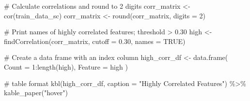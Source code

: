 \documentclass[
  letterpaper,
  DIV=11,
  numbers=noendperiod]{scrreprt}
\newenvironment{Shaded}{\begin{snugshade}}{\end{snugshade}}
\newcommand{\AttributeTok}[1]{\textcolor[rgb]{0.40,0.45,0.13}{#1}}
\newcommand{\CommentTok}[1]{\textcolor[rgb]{0.37,0.37,0.37}{#1}}
\newcommand{\ConstantTok}[1]{\textcolor[rgb]{0.56,0.35,0.01}{#1}}
\newcommand{\DecValTok}[1]{\textcolor[rgb]{0.68,0.00,0.00}{#1}}
\newcommand{\FloatTok}[1]{\textcolor[rgb]{0.68,0.00,0.00}{#1}}
\newcommand{\FunctionTok}[1]{\textcolor[rgb]{0.28,0.35,0.67}{#1}}
\newcommand{\NormalTok}[1]{\textcolor[rgb]{0.00,0.23,0.31}{#1}}
\newcommand{\OtherTok}[1]{\textcolor[rgb]{0.00,0.23,0.31}{#1}}
\newcommand{\SpecialCharTok}[1]{\textcolor[rgb]{0.37,0.37,0.37}{#1}}
\newcommand{\StringTok}[1]{\textcolor[rgb]{0.13,0.47,0.30}{#1}}
\begin{document}
\begin{Shaded}
\begin{Highlighting}[]
\CommentTok{\# Calculate correlations and round to 2 digits}
\NormalTok{corr\_matrix }\OtherTok{\textless{}{-}} \FunctionTok{cor}\NormalTok{(train\_data\_sc)}
\NormalTok{corr\_matrix }\OtherTok{\textless{}{-}} \FunctionTok{round}\NormalTok{(corr\_matrix, }\AttributeTok{digits =} \DecValTok{2}\NormalTok{)}

\CommentTok{\# Print names of highly correlated features; threshold \textgreater{} 0.30}
\NormalTok{high }\OtherTok{\textless{}{-}} \FunctionTok{findCorrelation}\NormalTok{(corr\_matrix, }\AttributeTok{cutoff =} \FloatTok{0.30}\NormalTok{, }\AttributeTok{names =} \ConstantTok{TRUE}\NormalTok{)}

\CommentTok{\# Create a data frame with an index column}
\NormalTok{high\_corr\_df }\OtherTok{\textless{}{-}} \FunctionTok{data.frame}\NormalTok{(}
  \AttributeTok{Count =} \DecValTok{1}\SpecialCharTok{:}\FunctionTok{length}\NormalTok{(high),}
  \AttributeTok{Feature =}\NormalTok{ high}
\NormalTok{)}

\CommentTok{\# table format}
\FunctionTok{kbl}\NormalTok{(high\_corr\_df, }\AttributeTok{caption =} \StringTok{"Highly Correlated Features"}\NormalTok{) }\SpecialCharTok{\%\textgreater{}\%}
  \FunctionTok{kable\_paper}\NormalTok{(}\StringTok{"hover"}\NormalTok{)}
\end{Highlighting}
\end{Shaded}
\end{document}
